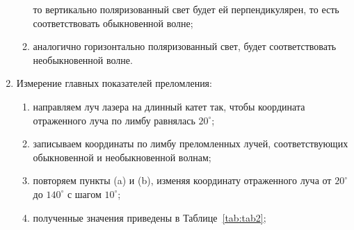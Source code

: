 \documentclass[12pt]{article}
\begin{document}
\begin{enumerate}
\begin{enumerate}
            то вертикально поляризованный свет будет ей перпендикулярен, то есть соответствовать обыкновенной волне;
            \item аналогично горизонтально поляризованный свет, будет соответствовать необыкновенной волне.
        \end{enumerate}
        \item Измерение главных показателей преломления:
        \begin{enumerate}
            \item направляем луч лазера на длинный катет так,
            чтобы координата отраженного луча по лимбу равнялась $20^{\circ}$;
            \item записываем координаты по лимбу преломленных лучей,
            соответствующих обыкновенной и необыкновенной волнам;
            \item повторяем пункты (a) и (b),
            изменяя координату отраженного луча от $20^{\circ}$ до $140^{\circ}$ с шагом $10^{\circ}$;
            \item полученные значения приведены в Таблице~\ref{tab:tab2};


\end{enumerate}
\end{enumerate}
\end{document}
